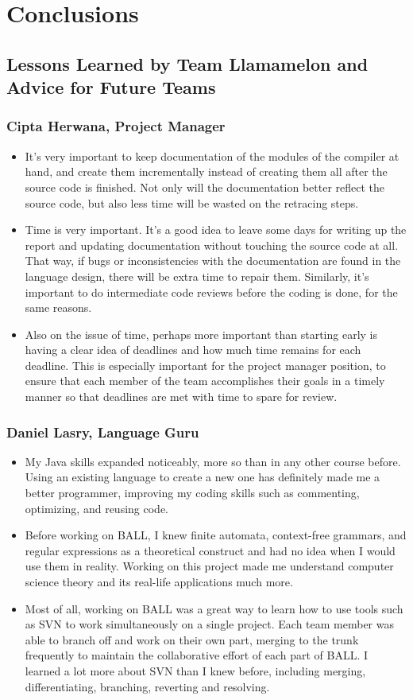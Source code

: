 \chapter{Conclusions}
\section{Lessons Learned by Team Llamamelon and Advice for Future Teams}
\subsection{Cipta Herwana, Project Manager}
\begin{itemize}
\item It's very important to keep documentation of the modules of the compiler at hand, and create them incrementally instead of creating them all after the source code is finished. Not only will the documentation better reflect the source code, but also less time will be wasted on the retracing steps.
\item Time is very important. It's a good idea to leave some days for writing up the report and updating documentation without touching the source code at all. That way, if bugs or inconsistencies with the documentation are found in the language design, there will be extra time to repair them. Similarly, it's important to do intermediate code reviews before the coding is done, for the same reasons.
\item Also on the issue of time, perhaps more important than starting early is having a clear idea of deadlines and how much time remains for each deadline. This is especially important for the project manager position, to ensure that each member of the team accomplishes their goals in a timely manner so that deadlines are met with time to spare for review.
\end{itemize}
\subsection{Daniel Lasry, Language Guru}
\begin{itemize}
\item My Java skills expanded noticeably, more so than in any other course before. Using an existing language to create a new one has definitely made me a better programmer, improving my coding skills such as commenting, optimizing, and reusing code.
\item Before working on BALL, I knew finite automata, context-free grammars, and regular expressions as a theoretical construct and had no idea when I would use them in reality. Working on this project made me understand computer science theory and its real-life applications much more.
\item Most of all, working on BALL was a great way to learn how to use tools such as SVN to work simultaneously on a single project. Each team member was able to branch off and work on their own part, merging to the trunk frequently to maintain the collaborative effort of each part of BALL. I learned a lot more about SVN than I knew before, including merging, differentiating, branching, reverting and resolving.
\end {itemize}
